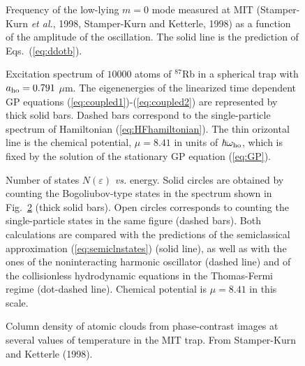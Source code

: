 \bigskip

\begin{figure}[t]
\epsfysize=8cm
\hspace{3cm}
\caption{ Frequency of the low-lying $m=0$ mode measured at 
MIT (Stamper-Kurn {\it et al.}, 1998, Stamper-Kurn and Ketterle, 1998) 
as a function of the amplitude of the oscillation. 
The solid line is the prediction of 
Eqs.~(\protect\ref{eq:ddotb}). } 
\label{fig:ampshift}
\end{figure}

\bigskip

\begin{figure}[t]
\epsfysize=10cm
\hspace{3cm}
\caption{Excitation spectrum of $10000$ atoms of $^{87}$Rb in a 
spherical trap with $a_{\rm ho}=0.791$ $\mu$m.  The eigenenergies
of the linearized time dependent GP equations 
(\protect\ref{eq:coupled1})-(\protect\ref{eq:coupled2}) are 
represented by thick solid bars.  Dashed bars correspond to the 
single-particle spectrum of Hamiltonian (\protect\ref{eq:HFhamiltonian}). 
The thin orizontal line is the chemical potential, $\mu=8.41$ in units 
of $\hbar \omega_{\rm ho}$, which is fixed by the solution of the 
stationary GP equation (\protect\ref{eq:GP}).  } 
\label{fig:spectrum}
\end{figure}

\bigskip

\begin{figure}[t]
\epsfysize=8cm
\hspace{3cm}
\caption{Number of states $N(\varepsilon)$ {\it vs.} energy. 
Solid circles are obtained by counting the Bogoliubov-type 
states in the spectrum shown in Fig.~\protect\ref{fig:spectrum}
(thick solid bars). Open circles corresponds to counting the 
single-particle states in the same figure (dashed bars). 
Both calculations are compared with the predictions of the
semiclassical approximation (\protect\ref{eq:semiclnstates}) 
(solid line), as well as with  the ones of the noninteracting 
harmonic oscillator (dashed line) and of the collisionless 
hydrodynamic equations in the Thomas-Fermi regime (dot-dashed 
line). Chemical potential is $\mu=8.41$ in this scale. }
\label{fig:ne}
\end{figure}

\bigskip

\begin{figure}[t]
\epsfysize=10cm
\hspace{3cm}
\caption{Column density of atomic clouds from phase-contrast images at
several values of temperature in the MIT trap. From Stamper-Kurn
and Ketterle (1998).} 
\label{fig:profiles-T}
\end{figure}

